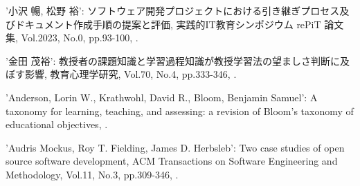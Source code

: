 \documentclass[a4paper,9pt, twocolumn]{jarticle}
\begin{document}
%
%
\begin{thebibliography}{9}
	\itemsep -1.7pt

	{\small '小沢 暢, 松野 裕':
	\newblock ソフトウェア開発プロジェクトにおける引き継ぎプロセス及びドキュメント作成手順の提案と評価,
	\newblock 実践的IT教育シンポジウム rePiT 論文集,
	\newblock Vol.2023,
	\newblock No.0,
	\newblock pp.93-100,
	.}

	{\small '金田 茂裕':
		\newblock 教授者の課題知識と学習過程知識が教授学習法の望ましさ判断に及ぼす影響,
		\newblock 教育心理学研究,
		\newblock Vol.70,
		\newblock No.4,
		\newblock pp.333-346,
		.}

	{\small 'Anderson, Lorin W., Krathwohl, David R., Bloom, Benjamin Samuel':
		\newblock A taxonomy for learning, teaching, and assessing: a revision of Bloom's taxonomy of educational objectives,
		.}

	{\small 'Audris Mockus, Roy T. Fielding, James D. Herbsleb':
		\newblock Two case studies of open source software development,
		\newblock ACM Transactions on Software Engineering and Methodology,
		\newblock Vol.11,
		\newblock No.3,
		\newblock pp.309-346,
		.}


\end{thebibliography}
\end{document}
